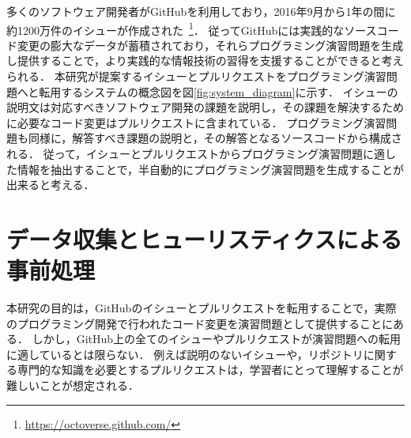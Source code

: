 多くのソフトウェア開発者がGitHubを利用しており，2016年9月から1年の間に約1200万件のイシューが作成された~\footnote{\url{https://octoverse.github.com/}}．
従ってGitHubには実践的なソースコード変更の膨大なデータが蓄積されており，それらプログラミング演習問題を生成し提供することで，より実践的な情報技術の習得を支援することができると考えられる．
本研究が提案するイシューとプルリクエストをプログラミング演習問題へと転用するシステムの概念図を図\ref{fig:system_diagram}に示す．
イシューの説明文は対応すべきソフトウェア開発の課題を説明し，その課題を解決するために必要なコード変更はプルリクエストに含まれている．
プログラミング演習問題も同様に，解答すべき課題の説明と，その解答となるソースコードから構成される．
従って，イシューとプルリクエストからプログラミング演習問題に適した情報を抽出することで，半自動的にプログラミング演習問題を生成することが出来ると考える．


\section{データ収集とヒューリスティクスによる事前処理}

本研究の目的は，GitHubのイシューとプルリクエストを転用することで，実際のプログラミング開発で行われたコード変更を演習問題として提供することにある．
しかし，GitHub上の全てのイシューやプルリクエストが演習問題への転用に適しているとは限らない．
例えば説明のないイシューや，リポジトリに関する専門的な知識を必要とするプルリクエストは，学習者にとって理解することが難しいことが想定される．

